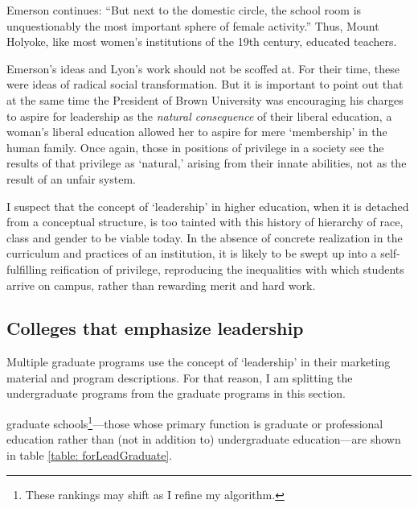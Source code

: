 Emerson continues: ``But next to the domestic circle, the school room is unquestionably the most important sphere of female activity.'' Thus, Mount Holyoke, like most women's institutions of the 19th century, educated teachers.

Emerson's ideas and Lyon's work should not be scoffed at. For their time, these were ideas of radical social transformation. But it is important to point out that at the same time the President of Brown University was encouraging his charges to aspire for leadership as the \emph{natural consequence} of their liberal education, a woman's liberal education allowed her to aspire for mere `membership' in the human family. Once again, those in positions of privilege in a society see the results of that privilege as `natural,' arising from their innate abilities, not as the result of an unfair system.

I suspect that the concept of `leadership' in higher education, when it is detached from a conceptual structure, is too tainted with this history of hierarchy of race, class and gender to be viable today. In the absence of concrete realization in the curriculum and practices of an institution, it is likely to be swept up into a self-fulfilling reification of privilege, reproducing the inequalities with which students arrive on campus, rather than rewarding merit and hard work.

\subsection{Colleges that emphasize leadership}
\label{collegesthatemphasizeleadership}

Multiple graduate programs use the concept of `leadership' in their marketing material and program descriptions. For that reason, I am splitting the undergraduate programs from the graduate programs in this section. 

 graduate schools\footnote{These rankings may shift as I refine my algorithm.}---those whose primary function is graduate or professional education rather than (not in addition to) undergraduate education---are shown in table \ref{table: forLeadGraduate}.

